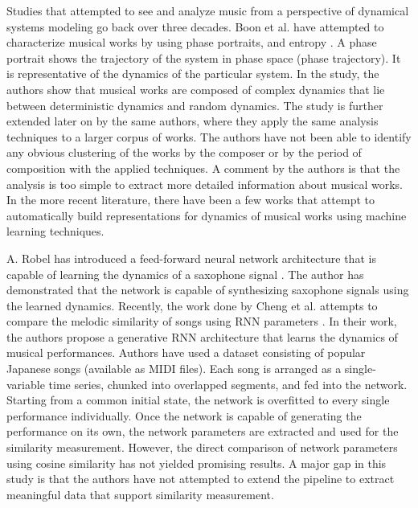 \documentclass[../main.tex]{subfiles}
\begin{document}
\par
Studies that attempted to see and analyze music from a perspective of dynamical systems modeling go back over three decades. Boon et al. have attempted to characterize musical works by using phase portraits, and entropy \cite{complex_dynamics}. A phase portrait shows the trajectory of the system in phase space (phase trajectory). It is representative of the dynamics of the particular system. In the study, the authors show that musical works are composed of complex dynamics that lie between deterministic dynamics and random dynamics. The study is further extended later on by the same authors\cite{boonDynamicalSystemsTheory1995}, where they apply the same analysis techniques to a larger corpus of works. The authors have not been able to identify any obvious clustering of the works by the composer or by the period of composition with the applied techniques. A comment by the authors is that the analysis is too simple to extract more detailed information about musical works. In the more recent literature, there have been a few works that attempt to automatically build representations for dynamics of musical works using machine learning techniques.

\par
A. Robel has introduced a feed-forward neural network architecture that is capable of learning the dynamics of a saxophone signal \cite{robelNeuralNetworkModeling1997}. The author has demonstrated that the network is capable of synthesizing saxophone signals using the learned dynamics. Recently, the work done by Cheng et al. attempts to compare the melodic similarity of songs using \gls{RNN} parameters \cite{tian_cheng_comparing_2018}. In their work, the authors propose a generative \gls{RNN} architecture that learns the dynamics of  musical performances. Authors have used a dataset consisting of popular Japanese songs (available as \gls{MIDI} files). Each song is arranged as a single-variable time series, chunked into overlapped segments, and fed into the network. Starting from a common initial state, the network is overfitted to every single performance individually. Once the network is capable of generating the performance on its own, the network parameters are extracted and used for the similarity measurement. However, the direct comparison of network parameters using cosine similarity has not yielded promising results. A major gap in this study is that the authors have not attempted to extend the pipeline to extract meaningful data that support similarity measurement.
\end{document}
